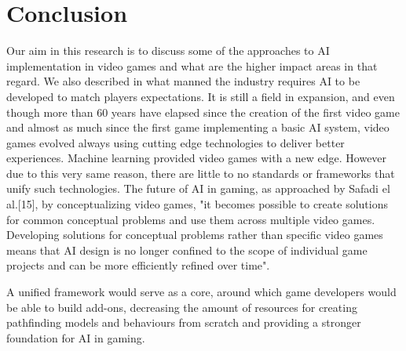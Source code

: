 \section{Conclusion}
Our aim in this research is to discuss some of the approaches to AI implementation in video games and what are the higher impact areas in that regard. We also described in what manned the industry requires AI to be developed to match players expectations. It is still a field in expansion, and even though more than 60 years have elapsed since the creation of the first video game and almost as much since the first game implementing a basic AI system, video games evolved always using cutting edge technologies to deliver better experiences. Machine learning provided video games with a new edge. However due to this very same reason, there are little to no standards or frameworks that unify such technologies. The future of AI in gaming, as approached by Safadi el al.[15], by conceptualizing video games, "it becomes possible
to create solutions for common conceptual problems and use them across multiple video games. Developing solutions for conceptual problems rather than specific video games means that AI design is no longer confined to the scope of
individual game projects and can be more efficiently refined over time".

\vspace{2mm}
A unified framework would serve as a core, around which game developers would be able to build add-ons, decreasing the amount of resources for creating pathfinding models and behaviours from scratch and providing a stronger foundation for AI in gaming.



